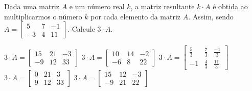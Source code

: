Dada uma matriz $A$ e um número real $k$, a matriz resultante $k\cdot A$ é obtida ao multiplicarmos o número $k$ por cada elemento da matriz $A$. Assim, sendo $A = \left[ \begin{array}{ccc}
5 & 7 & -1 \\
-3 & 4 & 11
\end{array} \right]$. Calcule $3\cdot A$.

$3\cdot A = \left[ \begin{array}{ccc} 15 & 21 & -3 \\ -9 & 12 & 33 \end{array} \right]$
$3\cdot A = \left[ \begin{array}{ccc} 10 & 14 & -2 \\ -6 & 8 & 22 \end{array} \right]$
$3\cdot A = \left[ \begin{array}{ccc} \frac{5}{3} & \frac{7}{3} & \frac{-1}{3} \\ -1 & \frac{4}{3} & \frac{11}{3} \end{array} \right]$
$3\cdot A = \left[ \begin{array}{ccc} 0 & 21 & 3 \\ 9 & 12 & 33 \end{array} \right]$
$3\cdot A = \left[ \begin{array}{ccc} 15 & 12 & -3 \\ -9 & 21 & 22 \end{array} \right]$



